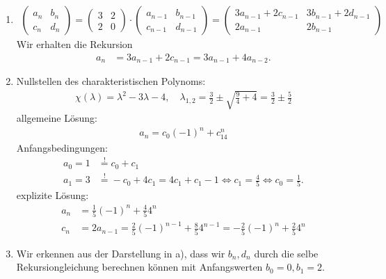 \begin{solution}
\phantom{}
\begin{enumerate}[label = \alph*)]
  \item
  \begin{align*}
    \begin{pmatrix}a_n & b_n \\ c_n & d_n\end{pmatrix}
    = \begin{pmatrix}3 & 2 \\ 2 & 0\end{pmatrix}\cdot
    \begin{pmatrix}a_{n-1} & b_{n-1} \\ c_{n-1} & d_{n-1}\end{pmatrix}
    = \begin{pmatrix}
      3a_{n-1} + 2c_{n-1} & 3b_{n-1} + 2d_{n-1} \\ 2a_{n-1} & 2b_{n-1}
    \end{pmatrix}
  \end{align*}
  Wir erhalten die Rekursion
  \begin{align*}
    a_n &= 3a_{n-1} + 2c_{n-1} = 3a_{n-1} + 4a_{n-2}.
  \end{align*}
  \item Nullstellen des charakteristischen Polynoms:
  \begin{align*}
    \chi(\lambda) = \lambda^2 - 3\lambda - 4, \quad \lambda_{1,2} = \frac{3}{2} \pm \sqrt{\frac{9}{4} + 4}
    = \frac{3}{2} \pm \frac{5}{2}
  \end{align*}
  allgemeine Lösung:
  \begin{align*}
    a_n = c_0(-1)^n + c_14^n
  \end{align*}
  Anfangsbedingungen:
  \begin{align*}
    a_0 = 1 &\stackrel{!}{=} c_0 + c_1 \\
    a_1 = 3 &\stackrel{!}{=} -c_0 + 4c_1 = 4c_1 + c_1 - 1 \iff c_1 = \frac{4}{5}
    \iff c_0 = \frac{1}{5}.
  \end{align*}
  explizite Lösung:
  \begin{align*}
    a_n &= \frac{1}{5}(-1)^n  + \frac{4}{5}4^n \\
    c_n &= 2a_{n-1} = \frac{2}{5}(-1)^{n-1} + \frac{8}{5}4^{n-1} = -\frac{2}{5}(-1)^n + \frac{2}{5}4^n
  \end{align*}
  \item Wir erkennen aus der Darstellung in a), dass wir $b_n, d_n$ durch die
  selbe Rekursiongleichung berechnen können mit Anfangswerten $b_0 = 0, b_1 = 2$.

\end{enumerate}
\end{solution}
